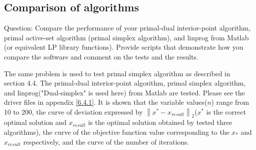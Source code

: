 \subsection{\bfseries Comparison of algorithms}
\begin{shaded}
{Question: Compare the performance of your primal-dual interior-point algorithm, primal
active-set algorithm (primal simplex algorithm), and linprog from Matlab (or
equivalent LP library functions). Provide scripts that demonstrate how you compare the software and comment on the tests and the results.}
\end{shaded}
The same problem is used to test primal simplex algorithm as described in section 4.4. The primal-dual interior-point algorithm, primal simplex algorithm, and linprog("Dual-simplex" is used here) from Matlab are tested. Please see the driver files in appendix \ref{6.4.1}. It is shown that the variable values($n$) range from 10 to 200, the curve of deviation expressed by $\left\|x^*-x_{result}\right\|_2$($x^*$ is the correct optimal solution and $x_{result}$ is the optimal solution obtained by tested three algorithms), the curve of the objective function value corresponding to the $x_{*}$ and $x_{result}$ respectively, and the curve of the number of iterations.
\vspace{-0.5cm}
